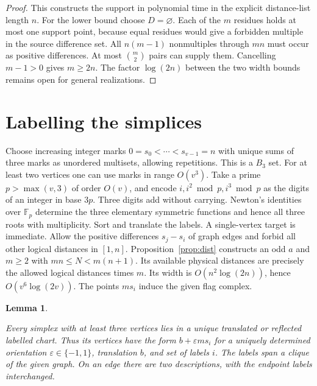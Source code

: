 \documentclass[11pt,letterpaper]{article}
\newtheorem{lemma}[theorem]{Lemma}
\numberwithin{equation}{section}
\begin{document}
\begin{proof}
This constructs the support in polynomial time in the explicit distance-list length \(n\). For
the lower bound choose \(D=\varnothing\). Each of the \(m\) residues holds at most one support
point, because equal residues would give a forbidden multiple in the source difference set.
All \(n(m-1)\) nonmultiples through \(mn\) must occur as positive differences. At most
\(\binom m2\) pairs can supply them. Cancelling \(m-1>0\) gives \(m\ge2n\). The factor
\(\log(2n)\) between the two width bounds remains open for general realizations.
\end{proof}

\section{Labelling the simplices}\label{sec:charts}

Choose increasing integer marks \(0=s_0<\cdots<s_{v-1}=n\) with unique sums of three marks as
unordered multisets, allowing repetitions. This is a $B_3$ set. For at least two vertices one
can use marks in range \(O(v^3)\). Take a prime \(p>\max(v,3)\) of order \(O(v)\), and encode
\(i,i^2\bmod p,i^3\bmod p\) as the digits of an integer in base \(3p\). Three digits add
without carrying. Newton's identities over \(\mathbb F_p\) determine the three elementary
symmetric functions and hence all three roots with multiplicity. Sort and translate the
labels. A single-vertex target is immediate. Allow the positive differences \(s_j-s_i\) of
graph edges and forbid all other logical distances in \([1,n]\). Proposition~\ref{prop:dist}
constructs an odd \(a\) and \(m\ge2\) with \(mn\le N<m(n+1)\). Its available physical
distances are precisely the allowed logical distances times \(m\). Its width is
\(O(n^2\log(2n))\), hence \(O(v^6\log(2v))\). The points \(ms_i\) induce the given flag
complex.

\begin{lemma}\label{lem:charts}

Every simplex with at least three vertices lies in a unique translated or reflected labelled
chart. Thus its vertices have the form $b+\varepsilon m s_i$ for a uniquely determined
orientation $\varepsilon\in\{-1,1\}$, translation $b$, and set of labels $i$. The labels span
a clique of the given graph. On an edge there are two descriptions, with the endpoint labels
interchanged.
\end{lemma}
\end{document}

